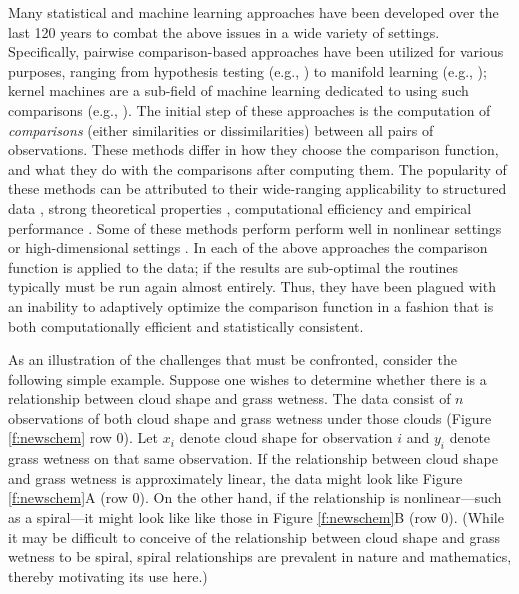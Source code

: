 \documentclass[11pt]{article}
\begin{document}
Many statistical and machine learning approaches have been developed over the last 120 years to combat the above issues in a wide variety of  settings. Specifically, pairwise comparison-based approaches have been utilized  for various purposes, ranging from hypothesis testing (e.g., \cite{David1966,Mantel1967,Friedman1983,Schilling1986,Maa1996,SzekelyRizzo2009,SzekelyRizzo2013b,HellerGorfine2013,Dumcke2014}) 
to manifold learning (e.g., \cite{TorgersonBook, TenenbaumSilvaLangford2000, SaulRoweis2000, BelkinNiyogi2003,DiffusionPNAS, MMS:NoisyDictionaryLearning}); kernel machines are a sub-field of machine learning dedicated to using such comparisons (e.g., \cite{scholkopf2002learning,GrettonEtAl2005,harchaoui2013kernel}).
The initial step of these approaches is the computation of \emph{comparisons} (either  similarities or dissimilarities) between all pairs of observations.
These methods differ in how they choose the comparison function, and what they do with the comparisons after computing them. 
The popularity of these methods can be attributed to their wide-ranging applicability to structured data \cite{scholkopf2002learning}, strong theoretical properties \cite{SilvaTenenbaum2002,Allard2012}, computational efficiency and empirical performance \cite{lu2014scale}.
Some of these methods perform perform well in nonlinear settings \cite{HellerGorfine2013} or high-dimensional settings \cite{SzekelyRizzo2013a}. In each of the above approaches the   comparison function is applied to the data; if the results are sub-optimal the routines typically must be run again almost entirely.  Thus,  they have been plagued with an inability to adaptively optimize the comparison function in a fashion that is both computationally efficient and statistically consistent.  



As an illustration of the challenges that must be confronted, consider the following simple example.
Suppose one wishes to determine whether there is a relationship between cloud shape and grass wetness.  The data consist of $n$ observations of both cloud shape and grass wetness under those clouds (Figure \ref{f:newschem} row 0).
Let $x_i$ denote cloud shape for observation $i$ and $y_i$ denote grass wetness on that same observation. 
If the relationship between cloud shape and grass wetness is approximately linear, the data might look like Figure \ref{f:newschem}{\color{magenta}A} (row 0). 
On the other hand, if the relationship is nonlinear---such as a  spiral---it might look like
like those in Figure \ref{f:newschem}{\color{magenta}B} (row 0).
(While it may be difficult to conceive of the relationship between cloud shape and grass wetness to be spiral, spiral relationships are prevalent in nature and mathematics, thereby motivating its use here.)
\end{document}
